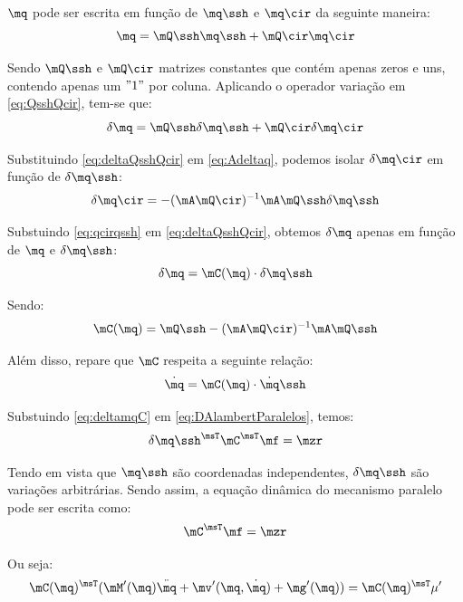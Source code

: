 \documentclass[]{politex}
\begin{document}
$\mq$ pode ser escrita em função de $\mq\ssh$ e $\mq\cir$ da seguinte maneira:
\begin{equation} \label{eq:QsshQcir}
\mq = \mQ\ssh \mq\ssh + \mQ\cir \mq\cir
\end{equation}

Sendo $\mQ\ssh$ e $\mQ\cir$ matrizes constantes que contém apenas zeros e uns, contendo apenas um $"1"$ por coluna.
Aplicando o operador variação em \eqref{eq:QsshQcir}, tem-se que:
\begin{equation} \label{eq:deltaQsshQcir}
\delta\mq = \mQ\ssh \delta\mq\ssh + \mQ\cir \delta\mq\cir
\end{equation}

Substituindo \eqref{eq:deltaQsshQcir} em \eqref{eq:Adeltaq}, podemos isolar $\delta\mq\cir$ em função de $\delta\mq\ssh$:
\begin{equation} \label{eq:qcirqssh}
\delta\mq\cir = -(\mA \mQ\cir)^{-1} \mA \mQ\ssh \delta \mq\ssh
\end{equation}

Substuindo \eqref{eq:qcirqssh} em \eqref{eq:deltaQsshQcir}, obtemos $\delta\mq$ apenas em função de $\mq$ e $\delta\mq\ssh$:
\begin{equation} \label{eq:deltamqC}
\delta \mq = \mC(\mq) \cdot \delta\mq\ssh
\end{equation}

Sendo:
\begin{equation} \label{eq:CComplemento}
\mC(\mq) = \mQ\ssh -(\mA \mQ\cir)^{-1} \mA \mQ\ssh 
\end{equation}


Além disso, repare que $\mC$ respeita a seguinte relação:
\begin{equation} \label{eq:CCinematica}
\dot{\mq} = \mC(\mq) \cdot \dot{\mq}\ssh
\end{equation}

Substuindo \eqref{eq:deltamqC} em \eqref{eq:DAlambertParalelos}, temos:
\begin{equation}
\delta {\mq\ssh}^\msT \mC^\msT \mf = \mzr
\end{equation}

Tendo em vista que $\mq\ssh$ são coordenadas independentes, $\delta \mq\ssh$ são variações arbitrárias. Sendo assim, a equação dinâmica do mecanismo paralelo pode ser escrita como:
\begin{equation}
\mC^\msT \mf = \mzr
\end{equation}

Ou seja:
\begin{equation} \label{eq:EquacaoDinamicaParalelos}
\mC(\mq)^\msT (   \mM'(\mq)\ddot{\mq} + \mv'(\mq,\dot{\mq}) + \mg'(\mq) ) = \mC(\mq)^\msT \mu'
\end{equation}
\end{document}
